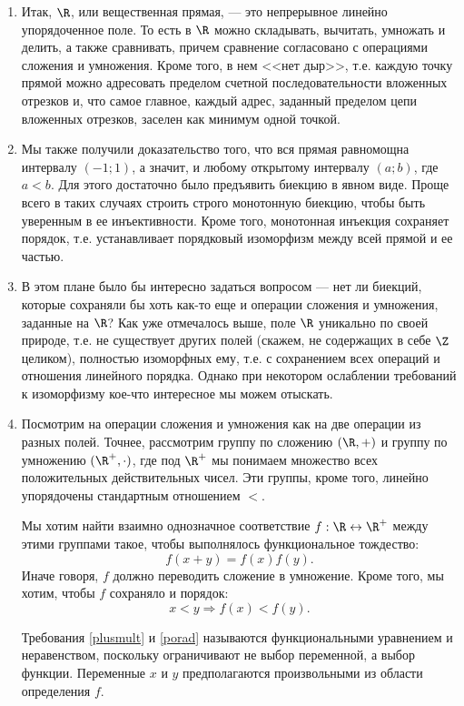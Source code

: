 \begin{enumerate}
\item Итак, $\R$, или вещественная прямая, --- это непрерывное линейно упорядоченное поле. То есть в $\R$ можно складывать, вычитать, умножать и делить, а также сравнивать, причем сравнение согласовано с операциями сложения и умножения. Кроме того, в нем <<нет дыр>>, т.е. каждую точку прямой можно адресовать пределом счетной последовательности вложенных отрезков и, что самое главное, каждый адрес, заданный пределом цепи вложенных отрезков, заселен как минимум одной точкой.
\item Мы также получили доказательство того, что вся прямая равномощна интервалу $(-1;1)$, а значит, и любому открытому интервалу $(a;b)$, где $a<b$. Для этого достаточно было предъявить биекцию в явном виде. Проще всего в таких случаях строить строго монотонную биекцию, чтобы быть уверенным в ее инъективности. Кроме того, монотонная инъекция сохраняет порядок, т.е. устанавливает порядковый изоморфизм между всей прямой и ее частью.
\item В этом плане было бы интересно задаться вопросом --- нет ли биекций, которые сохраняли бы хоть как-то еще и операции сложения и умножения, заданные на $\R$? Как уже отмечалось выше, поле $\R$ уникально по своей природе, т.е. не существует других полей (скажем, не содержащих в себе $\Z$ целиком), полностью изоморфных ему, т.е. с сохранением всех операций и отношения линейного порядка. Однако при некотором ослаблении требований к изоморфизму кое-что интересное мы можем отыскать.
\item Посмотрим на операции сложения и умножения как на две операции из разных полей. Точнее, рассмотрим группу по сложению $(\R,+)$ и группу по умножению $(\R^+,\cdot)$, где под $\R^+$ мы понимаем множество всех положительных действительных чисел. Эти группы, кроме того, линейно упорядочены стандартным отношением $<$.

Мы хотим найти взаимно однозначное соответствие $f:\R\leftrightarrow\R^+$ между этими группами такое, чтобы выполнялось функциональное тождество:
\begin{equation}\label{plusmult}
f(x+y)=f(x)f(y).
\end{equation}
Иначе говоря, $f$ должно переводить сложение в умножение. Кроме того, мы хотим, чтобы $f$ сохраняло и порядок:
\begin{equation}\label{porad}
x<y\Rightarrow f(x)<f(y).
\end{equation}

Требования \eqref{plusmult} и \eqref{porad} называются функциональными уравнением и неравенством, поскольку ограничивают не выбор переменной, а выбор функции. Переменные $x$ и $y$ предполагаются произвольными из области определения $f$.


\end{enumerate}
